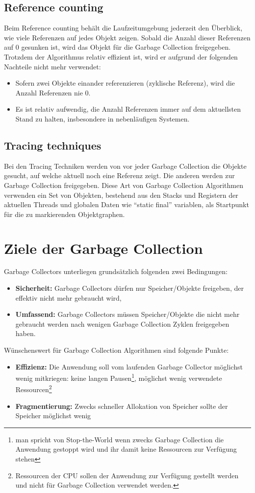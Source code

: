 \subsection{Reference counting\cite[S. 77]{lagergren2010oracle}}
Beim Reference counting behält die Laufzeitumgebung jederzeit den Überblick, wie viele Referenzen auf jedes Objekt zeigen. Sobald die Anzahl dieser Referenzen auf 0 gesunken ist, wird das Objekt für die Garbage Collection freigegeben. Trotzdem der Algorithmus relativ effizient ist, wird er aufgrund der folgenden Nachteile nicht mehr verwendet:
\begin{itemize}
	\item Sofern zwei Objekte einander referenzieren (zyklische Referenz), wird die Anzahl Referenzen nie 0.
	\item Es ist relativ aufwendig, die Anzahl Referenzen immer auf dem aktuellsten Stand zu halten, insbesondere in nebenläufigen Systemen.
\end{itemize}
\subsection{Tracing techniques\cite[S. 77]{lagergren2010oracle}}
Bei den Tracing Techniken werden von vor jeder Garbage Collection die Objekte gesucht, auf welche aktuell noch eine Referenz zeigt. Die anderen werden zur Garbage Collection freigegeben. Diese Art von Garbage Collection Algorithmen verwenden ein Set von Objekten, bestehend aus den Stacks und Registern der aktuellen Threads und globalen Daten wie ``static final'' variablen, als Startpunkt für die zu markierenden Objektgraphen. 

\section{Ziele der Garbage Collection\cite[S. 4]{sunMemoryManagementWP}}
Garbage Collectors unterliegen grundsätzlich folgenden zwei Bedingungen:
\begin{itemize}
	\item \textbf{Sicherheit:} Garbage Collectors dürfen nur Speicher/Objekte freigeben, der effektiv nicht mehr gebraucht wird,
	\item \textbf{Umfassend:} Garbage Collectors müssen Speicher/Objekte die nicht mehr gebraucht werden nach wenigen Garbage Collection Zyklen freigegeben haben.
\end{itemize}

Wünschenswert für Garbage Collection Algorithmen sind folgende Punkte:
\begin{itemize}
	\item \textbf{Effizienz:} Die Anwendung soll vom laufenden Garbage Collector möglichst wenig mitkriegen: keine langen Pausen\footnote{man spricht von Stop-the-World wenn zwecks Garbage Collection die Anwendung gestoppt wird und ihr damit keine Ressourcen zur Verfügung stehen}, möglichst wenig verwendete Ressourcen\footnote{Ressourcen der CPU sollen der Anwendung zur Verfügung gestellt werden und nicht für Garbage Collection verwendet werden.}
	\item \textbf{Fragmentierung:} Zwecks schneller Allokation von Speicher sollte der Speicher möglichst wenig 
\end{itemize}

